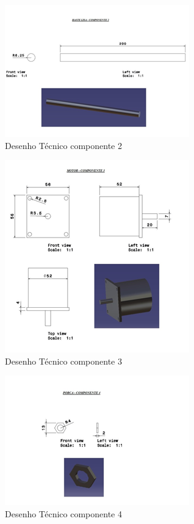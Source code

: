 \begin{apendicesenv}
\begin{figure}[H]
    \centering
      \includegraphics[scale=1.0]{figuras/tec2.png}
    \caption{Desenho Técnico componente 2}
    \label{tec2}
\end{figure}

\begin{figure}[H]
    \centering
      \includegraphics[scale=1.0]{figuras/tec3.png}
    \caption{Desenho Técnico componente 3}
    \label{tec3}
\end{figure}

\begin{figure}[H]
    \centering
      \includegraphics[scale=1.0]{figuras/tec4.png}
    \caption{Desenho Técnico componente 4}
    \label{tec4}
\end{figure}


\end{apendicesenv}
